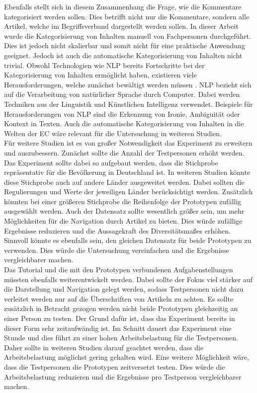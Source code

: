 Ebenfalls stellt sich in diesem Zusammenhang die Frage, wie die Kommentare kategorisiert werden sollen.
Dies betrifft nicht nur die Kommentare, sondern alle Artikel, welche im Begriffsverband dargestellt werden sollen.
In dieser Arbeit wurde die Kategorisierung von Inhalten manuell von Fachpersonen durchgeführt.
Dies ist jedoch nicht skalierbar und somit nicht für eine praktische Anwendung geeignet.
Jedoch ist auch die automatische Kategorisierung von Inhalten nicht trivial.
Obwohl Technologien wie \ac{NLP} bereits Fortschritte bei der Kategorisierung von Inhalten ermöglicht haben, existieren viele Herausforderungen, welche zunächst bewältigt werden müssen \cite{nlp}.
\ac{NLP} bezieht sich auf die Verarbeitung von natürlicher Sprache durch Computer.
Dabei werden Techniken aus der Linguistik und Künstlichen Intelligenz verwendet.
Beispiele für Herausforderungen von \ac{NLP} sind die Erkennung von Ironie, Ambiguität oder Kontext in Texten.
Auch die automatische Kategorisierung von Inhalten in die Welten der \ac{EC} wäre relevant für die Untersuchung in weiteren Studien.\\

Für weitere Studien ist es von großer Notwendigkeit das Experiment zu erweitern und auszubessern.
Zunächst sollte die Anzahl der Testpersonen erhöht werden.
Das Experiment sollte dabei so aufgebaut werden, dass die Stichprobe repräsentativ für die Bevölkerung in Deutschland ist.
In weiteren Studien könnte diese Stichprobe auch auf andere Länder ausgeweitet werden.
Dabei sollten die Regulierungen und Werte der jeweiligen Länder berücksichtigt werden.
Zusätzlich könnten bei einer größeren Stichprobe die Reihenfolge der Prototypen zufällig ausgewählt werden.
Auch der Datensatz sollte wesentlich größer sein, um mehr Möglichkeiten für die Navigation durch Artikel zu bieten.
Dies würde zufällige Ergebnisse reduzieren und die Aussagekraft des Diversitätsmaßes erhöhen.
Sinnvoll könnte es ebenfalls sein, den gleichen Datensatz für beide Prototypen zu verwenden.
Dies würde die Untersuchung vereinfachen und die Ergebnisse vergleichbarer machen.\\

Das Tutorial und die mit den Prototypen verbundenen Aufgabenstellungen müssten ebenfalls weiterentwickelt werden.
Dabei sollte der Fokus viel stärker auf die Darstellung und Navigation gelegt werden, sodass Testpersonen nicht dazu verleitet werden nur auf die Überschriften von Artikeln zu achten.
Es sollte zusätzlich in Betracht gezogen werden nicht beide Prototypen gleichzeitig an einer Person zu testen.
Der Grund dafür ist, dass das Experiment bereits in dieser Form sehr zeitaufwändig ist.
Im Schnitt dauert das Experiment eine Stunde und dies führt zu einer hohen Arbeitsbelastung für die Testpersonen.
Daher sollte in weiteren Studien darauf geachtet werden, dass die Arbeitsbelastung möglichst gering gehalten wird.
Eine weitere Möglichkeit wäre, dass die Testpersonen die Prototypen zeitversetzt testen.
Dies würde die Arbeitsbelastung reduzieren und die Ergebnisse pro Testperson vergleichbarer machen.\\
